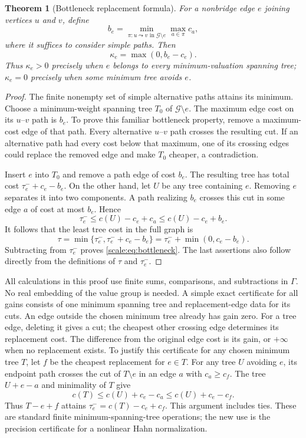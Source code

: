 \documentclass[11pt,a4paper]{article}
\numberwithin{equation}{section}
\newtheorem{theorem}{Theorem}[section]
\theoremstyle{definition}
\newcommand{\GG}{\mathcal G}
\begin{document}
\begin{theorem}[Bottleneck replacement formula]\label{scale:thm:bottleneck}
For a nonbridge edge $e$ joining vertices $u$ and $v$, define
\[
 b_e=\min_{\pi:u\leadsto v\text{ in }\GG\setminus e}
                   \max_{a\in\pi}c_a,
\]
where it suffices to consider simple paths. Then
\begin{equation}\label{scale:eq:bottleneck}
 \kappa_e=\max(0,b_e-c_e).
\end{equation}
Thus $\kappa_e>0$ precisely when $e$ belongs to every
minimum-valuation spanning tree; $\kappa_e=0$ precisely when some
minimum tree avoids $e$.
\end{theorem}
\begin{proof}
The finite nonempty set of simple alternative paths attains its minimum.
Choose a minimum-weight spanning tree $T_0$ of $\GG\setminus e$.
The maximum edge cost on its $u$--$v$ path is $b_e$.
To prove this familiar bottleneck property, remove a maximum-cost
edge of that path. Every alternative $u$--$v$ path crosses the
resulting cut. If an alternative path had every cost below that
maximum, one of its crossing edges could replace the removed edge
and make $T_0$ cheaper, a contradiction.

Insert $e$ into $T_0$ and remove a path edge of cost $b_e$.
The resulting tree has total cost $\tau_e^-+c_e-b_e$.
On the other hand, let $U$ be any tree containing $e$. Removing
$e$ separates it into two components. A path realizing $b_e$ crosses
this cut in some edge $a$ of cost at most $b_e$. Hence
\[
 \tau_e^-\leq c(U)-c_e+c_a\leq c(U)-c_e+b_e.
\]
It follows that the least tree cost in the full graph is
\[
 \tau=\min\{\tau_e^-,\tau_e^-+c_e-b_e\}
      =\tau_e^-+\min(0,c_e-b_e).
\]
Subtracting from $\tau_e^-$ proves \eqref{scale:eq:bottleneck}.
The last assertions also follow directly from the definitions of
$\tau$ and $\tau_e^-$.
\end{proof}

All calculations in this proof use finite sums, comparisons, and
subtractions in $\Gamma$. No real embedding of the value group is
needed. A simple exact certificate for all gains consists of one
minimum spanning tree and replacement-edge data for its cuts.
An edge outside the chosen minimum tree already has gain zero.
For a tree edge, deleting it gives a cut; the cheapest other crossing
edge determines its replacement cost. The difference from the
original edge cost is its gain, or $+\infty$ when no replacement
exists. To justify this certificate for any chosen minimum tree $T$, let
$f$ be the cheapest replacement for $e\in T$. For any tree $U$ avoiding
$e$, its endpoint path crosses the cut of $T\setminus e$ in an edge $a$
with $c_a\geq c_f$. The tree $U+e-a$ and minimality of $T$ give
\[
 c(T)\leq c(U)+c_e-c_a\leq c(U)+c_e-c_f.
\]
Thus $T-e+f$ attains $\tau_e^-=c(T)-c_e+c_f$. This argument includes ties.
These are standard finite minimum-spanning-tree operations;
the new use is the precision certificate for a nonlinear Hahn
normalization.
\end{document}

